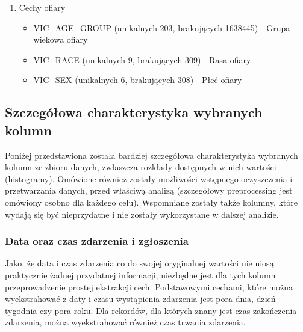 \documentclass{classrep}
\begin{document}
{{\begin{enumerate}
                \begin{itemize}
                    \item SUSP\_AGE\_GROUP (unikalnych 112, brakujących 4795235) - Grupa wiekowa podejrzanego
                    \item SUSP\_RACE (unikalnych 9, brakujących 3426694) - Rasa podejrzanego
                    \item SUSP\_SEX (unikalnych 4, brakujących 3560008) - Płeć podejrzanego
                \end{itemize}
                \item Cechy ofiary
                \begin{itemize}
                    \item VIC\_AGE\_GROUP (unikalnych 203, brakujących 1638445) - Grupa wiekowa ofiary
                    \item VIC\_RACE (unikalnych 9, brakujących 309) - Rasa ofiary
                    \item VIC\_SEX (unikalnych 6, brakujących 308) - Płeć ofiary
                \end{itemize}
            \end{enumerate}
        }

        \subsection{Szczegółowa charakterystyka wybranych kolumn} {
            
            Poniżej przedstawiona została bardziej szczegółowa charakterystyka wybranych kolumn ze zbioru danych, zwłaszcza rozkłady dostępnych w nich wartości (histogramy). Omówione również zostały możliwości wstępnego oczyszczenia i przetwarzania danych, przed właściwą analizą (szczegółowy preprocessing jest omówiony osobno dla każdego celu). Wspomniane zostały także kolumny, które wydają się być nieprzydatne i nie zostały wykorzystane w dalszej analizie.

            \subsubsection{Data oraz czas zdarzenia i zgłoszenia} {
                
                Jako, że data i czas zdarzenia co do swojej oryginalnej wartości nie niosą praktycznie żadnej przydatnej informacji, niezbędne jest dla tych kolumn przeprowadzenie prostej ekstrakcji cech. Podstawowymi cechami, które można wyekstrahować z daty i czasu wystąpienia zdarzenia jest pora dnia, dzień tygodnia czy pora roku. Dla rekordów, dla których znany jest czas zakończenia zdarzenia, można wyekstrahować również czas trwania zdarzenia.
                
}}}
\end{document}
